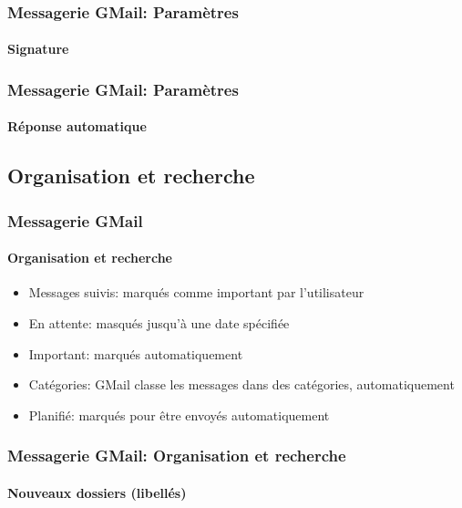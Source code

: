 \documentclass[xcolor=table]{beamer}
\begin{document}
\begin{frame}
\frametitle{Messagerie GMail: Paramètres}
\framesubtitle{Signature}

\begin{center}
\end{center}

\end{frame}

\begin{frame}
\frametitle{Messagerie GMail: Paramètres}
\framesubtitle{Réponse automatique}

\begin{center}
\end{center}

\end{frame}

\subsection{Organisation et recherche}

\begin{frame}
\frametitle{Messagerie GMail}
\framesubtitle{Organisation et recherche}

\begin{minipage}{0.69\textwidth}
	\begin{itemize}
		\item Messages suivis: marqués comme important par l'utilisateur
		\item En attente: masqués jusqu'à une date spécifiée
		\item Important: marqués automatiquement 
		\item Catégories: GMail classe les messages dans des catégories, automatiquement
		\item Planifié: marqués pour être envoyés automatiquement
	\end{itemize}
\end{minipage}
\begin{minipage}{0.26\textwidth}
\end{minipage}

\end{frame}

\begin{frame}
\frametitle{Messagerie GMail: Organisation et recherche}
\framesubtitle{Nouveaux dossiers (libellés)}


\end{frame}
\end{document}
